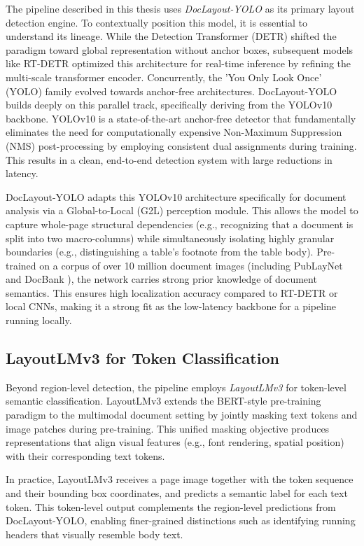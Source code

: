 The pipeline described in this thesis uses \textit{DocLayout-YOLO} \citep{doclayout_yolo} as its primary layout detection engine. To contextually position this model, it is essential to understand its lineage. While the Detection Transformer (DETR) shifted the paradigm toward global representation without anchor boxes, subsequent models like RT-DETR \citep{rtdetr_lv} optimized this architecture for real-time inference by refining the multi-scale transformer encoder. Concurrently, the 'You Only Look Once' (YOLO) family evolved towards anchor-free architectures. DocLayout-YOLO builds deeply on this parallel track, specifically deriving from the YOLOv10 backbone. YOLOv10 is a state-of-the-art anchor-free detector that fundamentally eliminates the need for computationally expensive Non-Maximum Suppression (NMS) post-processing by employing consistent dual assignments during training. This results in a clean, end-to-end detection system with large reductions in latency.

DocLayout-YOLO adapts this YOLOv10 architecture specifically for document analysis via a Global-to-Local (G2L) perception module. This allows the model to capture whole-page structural dependencies (e.g., recognizing that a document is split into two macro-columns) while simultaneously isolating highly granular boundaries (e.g., distinguishing a table's footnote from the table body). Pre-trained on a corpus of over 10 million document images (including PubLayNet \citep{publaynet} and DocBank \citep{docbank}), the network carries strong prior knowledge of document semantics. This ensures high localization accuracy compared to RT-DETR or local CNNs, making it a strong fit as the low-latency backbone for a pipeline running locally.

\subsection{LayoutLMv3 for Token Classification}
\label{subsec:layoutlmv3}

Beyond region-level detection, the pipeline employs \textit{LayoutLMv3} \citep{layoutlmv3} for token-level semantic classification. LayoutLMv3 extends the BERT-style pre-training paradigm to the multimodal document setting by jointly masking text tokens and image patches during pre-training. This unified masking objective produces representations that align visual features (e.g., font rendering, spatial position) with their corresponding text tokens.

In practice, LayoutLMv3 receives a page image together with the token sequence and their bounding box coordinates, and predicts a semantic label for each text token. This token-level output complements the region-level predictions from DocLayout-YOLO, enabling finer-grained distinctions such as identifying running headers that visually resemble body text.

